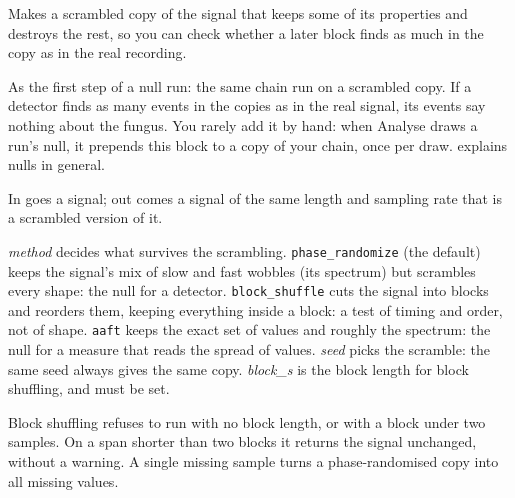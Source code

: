 Makes a scrambled copy of the signal that keeps some of its properties and destroys the rest,
so you can check whether a later block finds as much in the copy as in the real recording.

As the first step of a null run: the same chain run on a scrambled copy. If a detector finds
as many events in the copies as in the real signal, its events say nothing about the fungus.
You rarely add it by hand: when Analyse draws a run's null, it prepends this block to a copy
of your chain, once per draw.  explains nulls in general.

In goes a signal; out comes a signal of the same length and sampling rate that is a
scrambled version of it.

\emph{method} decides what survives the scrambling. \texttt{phase\_randomize} (the default)
keeps the signal's mix of slow and fast wobbles (its spectrum) but scrambles every shape:
the null for a detector. \texttt{block\_shuffle} cuts the signal into blocks and reorders
them, keeping everything inside a block: a test of timing and order, not of shape.
\texttt{aaft} keeps the exact set of values and roughly the spectrum: the null for a measure
that reads the spread of values. \emph{seed} picks the scramble: the same seed always gives
the same copy. \emph{block\_s} is the block length for block shuffling, and must be set.

Block shuffling refuses to run with no block length, or with a block under two samples. On a
span shorter than two blocks it returns the signal unchanged, without a warning. A single
missing sample turns a phase-randomised copy into all missing values.
